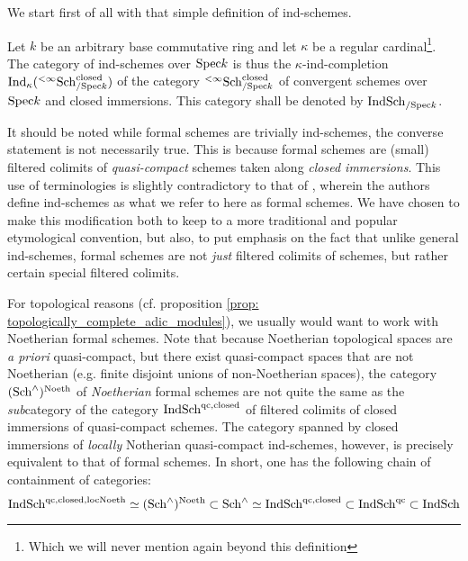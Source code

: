                 We start first of all with that simple definition of ind-schemes.
                \begin{definition} \label{def: ind-schemes}
                    Let $k$ be an arbitrary base commutative ring and let $\kappa$ be a regular cardinal\footnote{Which we will never mention again beyond this definition}. The category of ind-schemes over $\mathrm{Spec} k$ is thus the $\kappa$-ind-completion $\mathrm{Ind}_{\kappa}({}^{< \infty}\mathrm{Sch}_{/\mathrm{Spec} k}^{\mathrm{closed}})$ of the category ${}^{< \infty}\mathrm{Sch}_{/\mathrm{Spec} k}^{\mathrm{closed}}$ of convergent schemes over $\mathrm{Spec} k$ and closed immersions. This category shall be denoted by $\mathrm{Ind}\mathrm{Sch}_{/\mathrm{Spec} k}$.
                \end{definition}
                \begin{remark} \label{remark: ind_schemes_vs_formal_schemes}
                    It should be noted while formal schemes are trivially ind-schemes, the converse statement is not necessarily true. This is because formal schemes are (small) filtered colimits of \textit{quasi-compact} schemes taken along \textit{closed immersions}. This use of terminologies is slightly contradictory to that of \cite[Definition I.2.1.1.2]{GR2}, wherein the authors define ind-schemes as what we refer to here as formal schemes. We have chosen to make this modification both to keep to a more traditional and popular etymological convention, but also, to put emphasis on the fact that unlike general ind-schemes, formal schemes are not \textit{just} filtered colimits of schemes, but rather certain special filtered colimits.
                    
                    For topological reasons (cf. proposition \ref{prop: topologically_complete_adic_modules}), we usually would want to work with Noetherian formal schemes. Note that because Noetherian topological spaces are \textit{a priori} quasi-compact, but there exist quasi-compact spaces that are not Noetherian (e.g. finite disjoint unions of non-Noetherian spaces), the category $(\mathrm{Sch}^{\wedge})^{\mathrm{Noeth}}$ of \textit{Noetherian} formal schemes are not quite the same as the \textit{sub}category of the category $\mathrm{Ind}\mathrm{Sch}^{\mathrm{qc}, \mathrm{closed}}$ of filtered colimits of closed immersions of quasi-compact schemes. The category spanned by closed immersions of \textit{locally} Notherian quasi-compact ind-schemes, however, is precisely equivalent to that of formal schemes. In short, one has the following chain of containment of categories:
                        $$\mathrm{Ind}\mathrm{Sch}^{\mathrm{qc}, \mathrm{closed}, \mathrm{loc}\mathrm{Noeth}} \simeq (\mathrm{Sch}^{\wedge})^{\mathrm{Noeth}} \subset \mathrm{Sch}^{\wedge} \simeq \mathrm{Ind}\mathrm{Sch}^{\mathrm{qc}, \mathrm{closed}} \subset \mathrm{Ind}\mathrm{Sch}^{\mathrm{qc}} \subset \mathrm{Ind}\mathrm{Sch}$$
                \end{remark}
